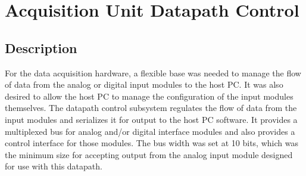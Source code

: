 \section[Datapath Control]{Acquisition Unit Datapath Control}
\subsection{Description}
For the data acquisition hardware, a flexible base was needed to manage the flow of data from the 
analog or digital input modules to the host PC. It was also desired to allow the host PC to manage 
the configuration of the input modules themselves. 
The datapath control subsystem regulates the flow of data from the input modules
 and serializes it for output to the host PC software. It provides a multiplexed bus for analog and/or 
digital interface modules and also provides a control interface for those modules. The bus width was 
set at 10 bits, which was the minimum size for accepting output from the analog input module designed 
for use with this datapath.
